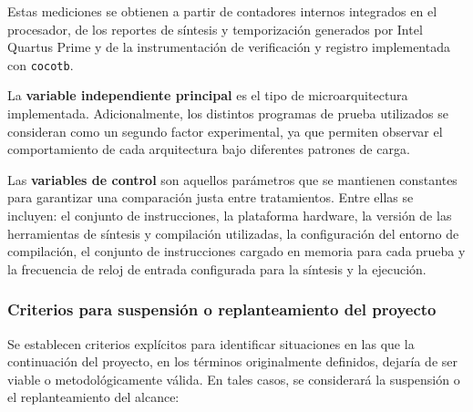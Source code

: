 Estas mediciones se obtienen a partir de contadores internos integrados en el procesador, de los reportes de síntesis y temporización generados por Intel Quartus Prime y de la instrumentación de verificación y registro implementada con \texttt{cocotb}.

La \textbf{variable independiente principal} es el tipo de microarquitectura implementada. Adicionalmente, los distintos programas de prueba utilizados se consideran como un segundo factor experimental, ya que permiten observar el comportamiento de cada arquitectura bajo diferentes patrones de carga.

Las \textbf{variables de control} son aquellos parámetros que se mantienen constantes para garantizar una comparación justa entre tratamientos. Entre ellas se incluyen: el conjunto de instrucciones, la plataforma hardware, la versión de las herramientas de síntesis y compilación utilizadas, la configuración del entorno de compilación, el conjunto de instrucciones cargado en memoria para cada prueba y la frecuencia de reloj de entrada configurada para la síntesis y la ejecución.

\subsubsection{Criterios para suspensión o replanteamiento del proyecto}

Se establecen criterios explícitos para identificar situaciones en las que la continuación del proyecto, en los términos originalmente definidos, dejaría de ser viable o metodológicamente válida. En tales casos, se considerará la suspensión o el replanteamiento del alcance:

